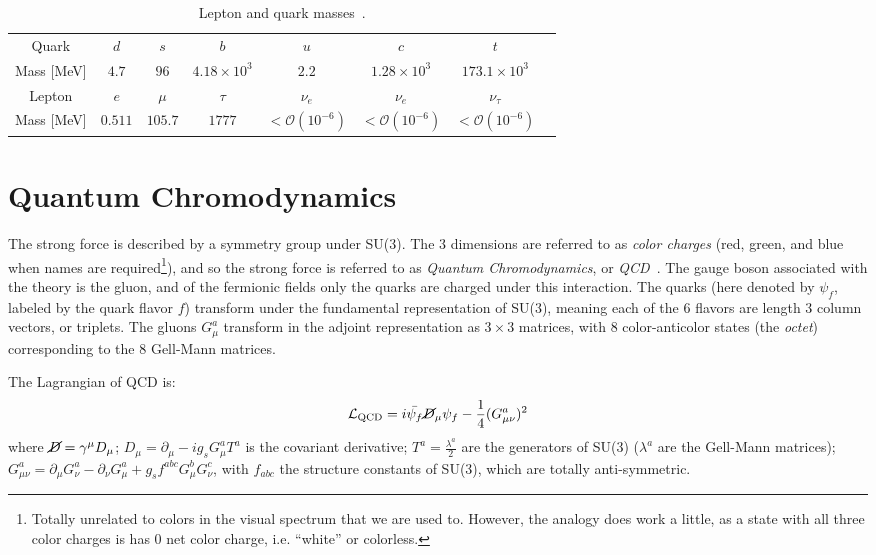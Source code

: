 \begin{table}[]
\centering
\caption{Lepton and quark masses~\cite{PDG}.}
\label{tab:SM:masses}
\begin{tabular}{c c c c c c c c}
\hline
Quark & $d$ & $s$ & $b$ & $u$ & $c$ & $t$ & \\
Mass [MeV] & $4.7$ & $96$ & $4.18\times10^3$ & $2.2$ & $1.28\times10^3$ & $173.1\times10^3$\\
\hline
Lepton & $e$ & $\mu$ & $\tau$ & $\nu_e$ & $\nu_e$ & $\nu_\tau$ & \\
Mass [MeV] & $0.511$ & $105.7$ & $1777$ & $<\mathcal{O}(10^{-6})$ & $<\mathcal{O}(10^{-6})$ & $<\mathcal{O}(10^{-6})$
\end{tabular}
\end{table}

\section{Quantum Chromodynamics}
\label{sec:SM:QCD}
The strong force is described by a symmetry group under SU(3).
The $3$ dimensions are referred to as \textit{color charges} (red, green, and blue when names are required\footnote{Totally unrelated to colors in the visual spectrum that we are used to. However, the analogy does work a little, as a state with all three color charges is has $0$ net color charge, i.e. ``white'' or colorless.}), and so the strong force is referred to as \textit{Quantum Chromodynamics}, or \textit{QCD}~\cite{Gell-Mann:2015noa,Fritzsch:1973pi,Fritzsch:1972jv,Ali:2010tw}.
The gauge boson associated with the theory is the gluon, and of the fermionic fields only the quarks are charged under this interaction.
The quarks (here denoted by $\psi_f$, labeled by the quark flavor $f$) transform under the fundamental representation of SU(3), meaning each of the $6$ flavors are length $3$ column vectors, or triplets.
The gluons $G_\mu^a$ transform in the adjoint representation as $3\times 3$ matrices, with $8$ color-anticolor states (the \textit{octet}) corresponding to the $8$ Gell-Mann matrices.

The Lagrangian of QCD is:
\begin{align}
  \mathcal{L}_\text{QCD} = i\bar{\psi_f}\cancel{D}_\mu\psi_f-\frac{1}{4}(G_{\mu\nu}^a)^2
\end{align}
where $\cancel{D}=\gamma^\mu D_\mu$; $D_\mu = \partial_\mu - ig_sG_\mu^aT^a$ is the covariant derivative; $T^a=\frac{\lambda^a}{2}$ are the generators of SU(3) ($\lambda^a$ are the Gell-Mann matrices); $G_{\mu\nu}^a = \partial_\mu G_\nu^a-\partial_\nu G_\mu^a + g_s f^{abc} G_\mu^b G_\nu^c$, with $f_{abc}$ the structure constants of SU(3), which are totally anti-symmetric.

